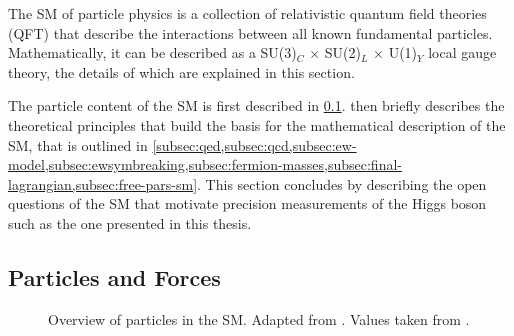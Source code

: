 

The SM of particle physics is a collection of relativistic quantum field theories (QFT) that describe the interactions between all known fundamental particles.
Mathematically, it can be described as a SU(3)$_C$ $\times$ SU(2)$_L$ $\times$ U(1)$_Y$ local gauge theory, the details of which are explained in this section.

The particle content of the SM is first described in \cref{subsec:particle-content}.  then briefly describes the theoretical principles that build the basis for the mathematical description of the SM, that is outlined in \cref{subsec:qed,subsec:qcd,subsec:ew-model,subsec:ewsymbreaking,subsec:fermion-masses,subsec:final-lagrangian,subsec:free-pars-sm}. This section concludes by describing the open questions of the SM that motivate precision measurements of the Higgs boson such as the one presented in this thesis.






\subsection{Particles and Forces}
\label{subsec:particle-content}

\begin{figure}
  \caption[Overview of particles in the SM.]{Overview of particles in the SM. Adapted from . Values taken from .}  
  \label{fig:particles-infographic}
\end{figure}


